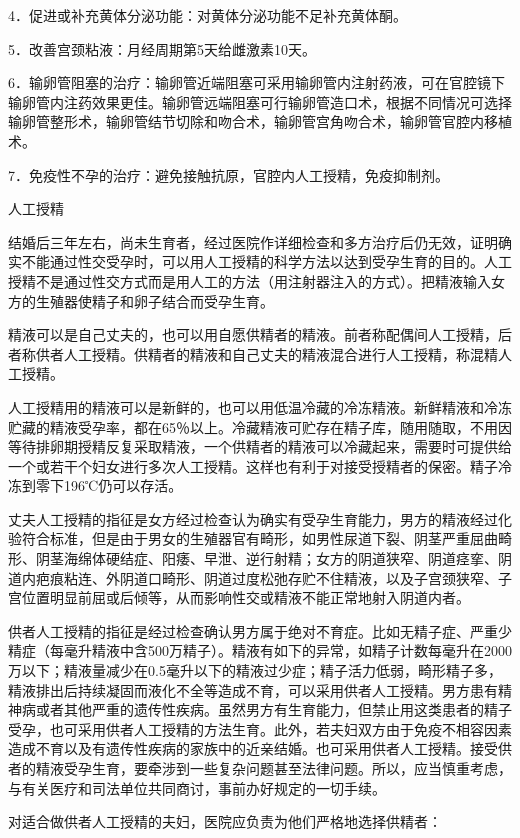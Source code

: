 \documentclass[12pt,UTF8]{ctexbook}
\begin{document}
4．促进或补充黄体分泌功能：对黄体分泌功能不足补充黄体酮。

5．改善宫颈粘液：月经周期第5天给雌激素10天。

6．输卵管阻塞的治疗：输卵管近端阻塞可采用输卵管内注射药液，可在官腔镜下输卵管内注药效果更佳。输卵管远端阻塞可行输卵管造口术，根据不同情况可选择输卵管整形术，输卵管结节切除和吻合术，输卵管宫角吻合术，输卵管官腔内移植术。

7．免疫性不孕的治疗：避免接触抗原，官腔内人工授精，免疫抑制剂。

人工授精

结婚后三年左右，尚未生育者，经过医院作详细检查和多方治疗后仍无效，证明确实不能通过性交受孕时，可以用人工授精的科学方法以达到受孕生育的目的。人工授精不是通过性交方式而是用人工的方法（用注射器注入的方式）。把精液输入女方的生殖器使精子和卵子结合而受孕生育。

精液可以是自己丈夫的，也可以用自愿供精者的精液。前者称配偶间人工授精，后者称供者人工授精。供精者的精液和自己丈夫的精液混合进行人工授精，称混精人工授精。

人工授精用的精液可以是新鲜的，也可以用低温冷藏的冷冻精液。新鲜精液和冷冻贮藏的精液受孕率，都在65％以上。冷藏精液可贮存在精子库，随用随取，不用因等待排卵期授精反复采取精液，一个供精者的精液可以冷藏起来，需要时可提供给一个或若干个妇女进行多次人工授精。这样也有利于对接受授精者的保密。精子冷冻到零下196℃仍可以存活。

丈夫人工授精的指征是女方经过检查认为确实有受孕生育能力，男方的精液经过化验符合标准，但是由于男女的生殖器官有畸形，如男性尿道下裂、阴茎严重屈曲畸形、阴茎海绵体硬结症、阳痿、早泄、逆行射精；女方的阴道狭窄、阴道痉挛、阴道内疤痕粘连、外阴道口畸形、阴道过度松弛存贮不住精液，以及子宫颈狭窄、子宫位置明显前屈或后倾等，从而影响性交或精液不能正常地射入阴道内者。

供者人工授精的指征是经过检查确认男方属于绝对不育症。比如无精子症、严重少精症（每毫升精液中含500万精子）。精液有如下的异常，如精子计数每毫升在2000万以下；精液量减少在0.5毫升以下的精液过少症；精子活力低弱，畸形精子多，精液排出后持续凝固而液化不全等造成不育，可以采用供者人工授精。男方患有精神病或者其他严重的遗传性疾病。虽然男方有生育能力，但禁止用这类患者的精子受孕，也可采用供者人工授精的方法生育。此外，若夫妇双方由于免疫不相容因素造成不育以及有遗传性疾病的家族中的近亲结婚。也可采用供者人工授精。接受供者的精液受孕生育，要牵涉到一些复杂问题甚至法律问题。所以，应当慎重考虑，与有关医疗和司法单位共同商讨，事前办好规定的一切手续。

对适合做供者人工授精的夫妇，医院应负责为他们严格地选择供精者：
\end{document}
